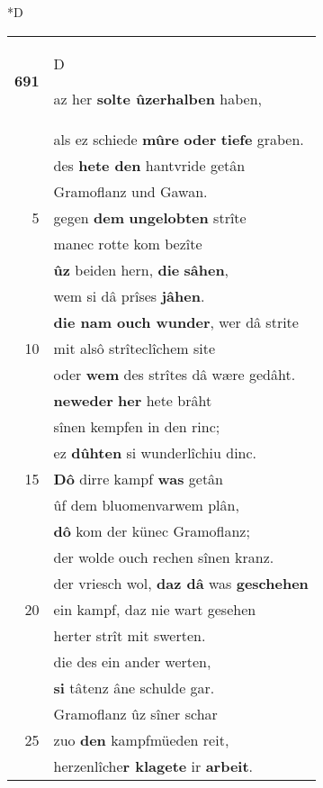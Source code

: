 \documentclass[8pt,a4paper,notitlepage]{article}
\begin{document}
\begin{table}[ht]
\begin{minipage}[t]{0.5\linewidth}
\small
\begin{center}*D
\end{center}
\begin{tabular}{rl}
\textbf{691} & \begin{large}D\end{large}az her \textbf{solte ûzerhalben} haben,\\ 
 & als ez schiede \textbf{mûre} \textbf{oder} \textbf{tiefe} graben.\\ 
 & des \textbf{hete den} hantvride getân\\ 
 & Gramoflanz und Gawan.\\ 
5 & gegen \textbf{dem} \textbf{ungelobten} strîte\\ 
 & manec rotte kom bezîte\\ 
 & \textbf{ûz} beiden hern, \textbf{die} \textbf{sâhen},\\ 
 & wem si dâ prîses \textbf{jâhen}.\\ 
 & \textbf{die nam ouch wunder}, wer dâ strite\\ 
10 & mit alsô strîteclîchem site\\ 
 & oder \textbf{wem} des strîtes dâ wære gedâht.\\ 
 & \textbf{neweder} \textbf{her} hete brâht\\ 
 & sînen kempfen in den rinc;\\ 
 & ez \textbf{dûhten} si wunderlîchiu dinc.\\ 
15 & \textbf{Dô} dirre kampf \textbf{was} getân\\ 
 & ûf dem bluomenvarwem plân,\\ 
 & \textbf{dô} kom der künec Gramoflanz;\\ 
 & der wolde ouch rechen sînen kranz.\\ 
 & der vriesch wol, \textbf{daz dâ} was \textbf{geschehen}\\ 
20 & ein kampf, daz nie wart gesehen\\ 
 & herter strît mit swerten.\\ 
 & die des ein ander werten,\\ 
 & \textbf{si} tâtenz âne schulde gar.\\ 
 & Gramoflanz ûz sîner schar\\ 
25 & zuo \textbf{den} kampfmüeden reit,\\ 
 & herzenlîche\textbf{r klagete} ir \textbf{arbeit}.\\ 

\end{tabular}
\end{minipage}
\end{table}
\end{document}
